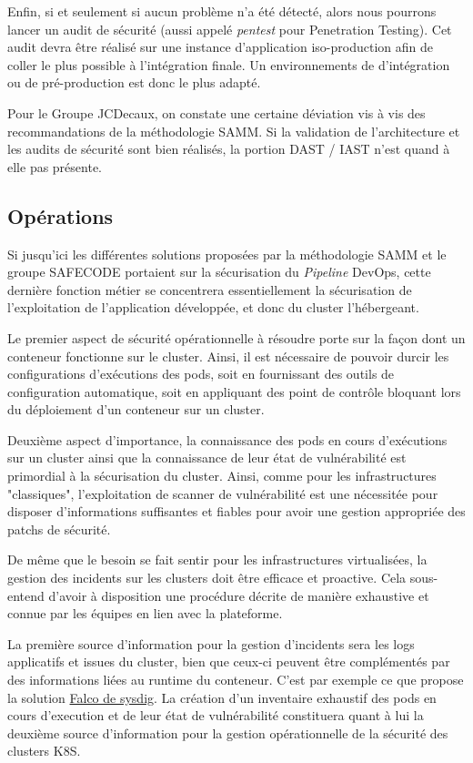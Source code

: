 Enfin, si et seulement si aucun problème n'a été détecté, alors nous pourrons lancer un audit de sécurité (aussi appelé 
\emph{pentest} pour Penetration Testing). Cet audit devra être réalisé sur une instance d'application iso-production afin
de coller le plus possible à l'intégration finale. Un environnements de d'intégration ou de pré-production est donc le 
plus adapté.

Pour le Groupe JCDecaux, on constate une certaine déviation vis à vis des recommandations de la méthodologie \ac{SAMM}.
Si la validation de l'architecture et les audits de sécurité sont bien réalisés, la portion \ac{DAST} / {IAST} n'est 
quand à elle pas présente.

\subsection{Opérations}
Si jusqu'ici les différentes solutions proposées par la méthodologie \ac{SAMM} et le groupe \ac{SAFECODE} portaient sur
la sécurisation du \emph{Pipeline} DevOps, cette dernière fonction métier se concentrera essentiellement la sécurisation
de l'exploitation de l'application développée, et donc du cluster l'hébergeant.

Le premier aspect de sécurité opérationnelle à résoudre porte sur la façon dont un conteneur fonctionne sur le cluster.
Ainsi, il est nécessaire de pouvoir durcir les configurations d'exécutions des pods, soit en fournissant des outils de 
configuration automatique, soit en  appliquant des point de contrôle bloquant lors du déploiement d'un conteneur sur un 
cluster.

Deuxième aspect d'importance, la connaissance des pods en cours d'exécutions sur un cluster ainsi que la connaissance de
leur état de vulnérabilité est primordial à la sécurisation du cluster. Ainsi, comme pour les infrastructures "classiques",
l'exploitation de scanner de vulnérabilité est une nécessitée pour disposer d'informations suffisantes et fiables pour
avoir une gestion appropriée des patchs de sécurité.

De même que le besoin se fait sentir pour les infrastructures virtualisées, la gestion des incidents sur les clusters doit 
être efficace et proactive. Cela sous-entend d'avoir à disposition une procédure décrite de manière exhaustive et connue
par les équipes en lien avec la plateforme.

La première source d'information pour la gestion d'incidents sera les logs applicatifs et issues du cluster, 
bien que ceux-ci peuvent être complémentés par des informations liées au runtime du conteneur. C'est par exemple ce que 
propose la solution \href{https://sysdig.com/opensource/falco/}{Falco de sysdig}.
\newline La création d'un inventaire exhaustif des pods en cours d'execution et de leur état de vulnérabilité
constituera quant à lui la deuxième source d'information pour la gestion opérationnelle de la sécurité des clusters 
\ac{K8S}.

